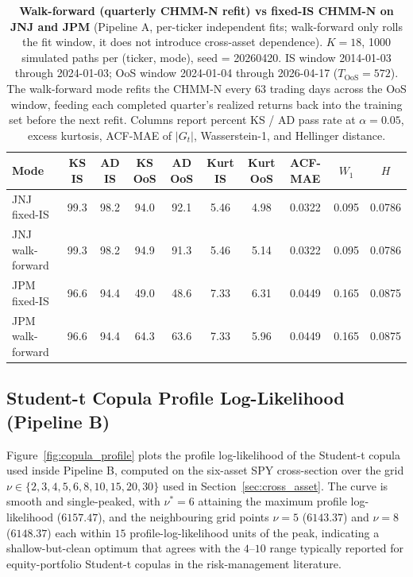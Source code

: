 \begin{table}[h]
\centering
\small
\caption{\textbf{Walk-forward (quarterly CHMM-N refit) vs fixed-IS CHMM-N on JNJ and JPM} (Pipeline A, per-ticker independent fits; walk-forward only rolls the fit window, it does not introduce cross-asset dependence). $K = 18$, 1000 simulated paths per (ticker, mode), seed = 20260420. IS window 2014-01-03 through 2024-01-03; OoS window 2024-01-04 through 2026-04-17 ($T_{\text{OoS}} = 572$). The walk-forward mode refits the CHMM-N every 63 trading days across the OoS window, feeding each completed quarter's realized returns back into the training set before the next refit. Columns report percent KS / AD pass rate at $\alpha = 0.05$, excess kurtosis, ACF-MAE of $|G_t|$, Wasserstein-1, and Hellinger distance.}
\label{tab:walk_forward}
\begin{tabular}{l cc cc cc c c c}
\toprule
Mode & KS IS & AD IS & KS OoS & AD OoS & Kurt IS & Kurt OoS & ACF-MAE & $W_1$ & $H$ \\
\midrule
JNJ fixed-IS      & 99.3 & 98.2 & 94.0 & 92.1 & 5.46 & 4.98 & 0.0322 & 0.095 & 0.0786 \\
JNJ walk-forward  & 99.3 & 98.2 & 94.9 & 91.3 & 5.46 & 5.14 & 0.0322 & 0.095 & 0.0786 \\
JPM fixed-IS      & 96.6 & 94.4 & 49.0 & 48.6 & 7.33 & 6.31 & 0.0449 & 0.165 & 0.0875 \\
JPM walk-forward  & 96.6 & 94.4 & 64.3 & 63.6 & 7.33 & 5.96 & 0.0449 & 0.165 & 0.0875 \\
\bottomrule
\end{tabular}
\end{table}

\subsection{Student-t Copula Profile Log-Likelihood (Pipeline B)}
\label{sec:copula_profile_supp}

Figure~\ref{fig:copula_profile} plots the profile log-likelihood of the Student-t copula used inside Pipeline B, computed on the six-asset SPY cross-section over the grid $\nu \in \{2, 3, 4, 5, 6, 8, 10, 15, 20, 30\}$ used in Section~\ref{sec:cross_asset}.
The curve is smooth and single-peaked, with $\nu^{*} = 6$ attaining the maximum profile log-likelihood ($6157.47$), and the neighbouring grid points $\nu = 5$ ($6143.37$) and $\nu = 8$ ($6148.37$) each within $15$ profile-log-likelihood units of the peak, indicating a shallow-but-clean optimum that agrees with the $4$--$10$ range typically reported for equity-portfolio Student-t copulas in the risk-management literature.

